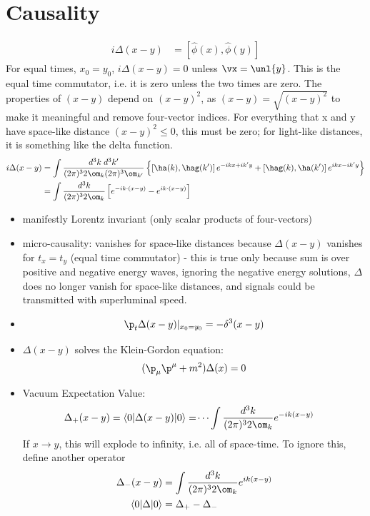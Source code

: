 \documentclass[a4paper, 11pt, normalem]{report}
\newcommand\hphi{\hat{\phi}}
\begin{document}
\section{Causality}
\begin{align}
    i\Delta(x-y) &= [\hphi(x),\hphi(y)]
\end{align}
For equal times, $x_0=y_0$, $i\Delta(x-y) = 0$ unless $\vx = \unl{y}$.
This is the equal time commutator, i.e. it is zero unless the two times are zero. 
The properties of $(x-y)$ depend on $(x-y)^2$, as $(x-y) = \sqrt{(x-y)^2}$ to make it meaningful and remove four-vector indices. 
For everything that x and y have space-like distance $(x-y)^2\leq0$, this must be zero; for light-like distances, it is something like the delta function.
\begin{align}
    i\Delta(x-y) &= \int \frac{d^3k\;d^3k'}{(2\pi)^32\om_k (2\pi)^3\om_{k'}} \left\{ \left[\ha(k),\hag(k')\right]e^{-ikx + ik'y} + \left[\hag(k),\ha(k')\right]e^{ikx-ik'y}\right\} \\
                 &= \int \frac{d^3k}{(2\pi)^3 2\om_k} \left[e^{-ik\cdot(x-y)} - e^{ik\cdot(x-y)}\right] 
\end{align}
\begin{itemize}
    \item manifestly Lorentz invariant (only scalar products of four-vectors)
    \item micro-causality: vanishes for space-like distances because $\Delta(x-y)$ vanishes for $t_x = t_y$ (equal time commutator) - this is true only because sum is over positive and negative energy waves, ignoring the negative energy solutions, $\Delta$ does no longer vanish for space-like distances, and signals could be transmitted with superluminal speed. 
    \item 
        \begin{align}
            \p_t\Delta(x-y)|_{x_0=y_0} = -\delta^3(x-y) 
        \end{align}
    \item $\Delta(x-y)$ solves the Klein-Gordon equation:
        \begin{equation}
            (\p_\mu\p^\mu + m^2)\Delta(x) = 0
        \end{equation}
    \item Vacuum Expectation Value:
        \begin{align}
            \Delta_+(x-y) &= \langle0|\Delta(x-y)|0\rangle = \dots \int\frac{d^3k}{(2\pi)^32\om_k} e^{-ik(x-y)}
        \end{align}
        If $x\to y$, this will explode to infinity, i.e. all of space-time. 
        To ignore this, define another operator
        \begin{align}
            \Delta_-(x-y) &= \int \frac{d^3k}{(2\pi)^32\om_k}e^{ik(x-y)} \\
            \langle0|\Delta|0\rangle &= \Delta_+ - \Delta_-
        \end{align}
\end{itemize}
\end{document}
